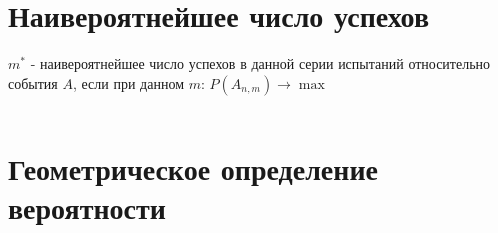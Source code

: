     \section{Наивероятнейшее число успехов}
    \begin{opr}
        \(m^{*}\) - наивероятнейшее число успехов в данной серии
        испытаний относительно события \(A\), если при данном \(m\): \(P(A_{n, m})\to \max\)
    \end{opr}
    \begin{equation}
        
    \end{equation}
    \section{Геометрическое определение вероятности}

